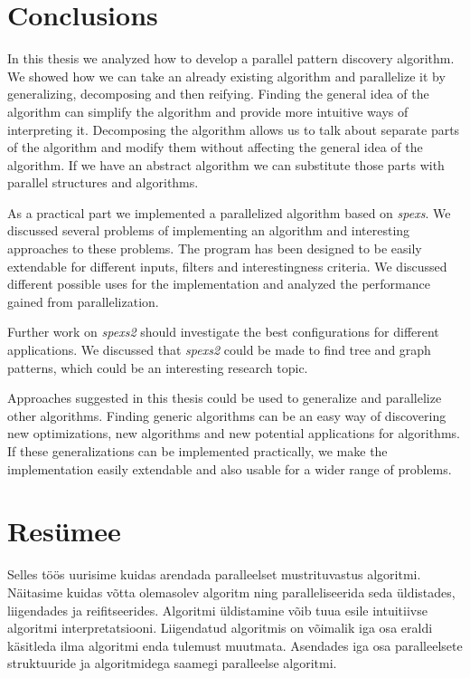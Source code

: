 \chapter{Conclusions}
\label{c:conclusions}

In this thesis we analyzed how to develop a parallel pattern discovery algorithm. We showed how we can take an already existing algorithm and parallelize it by generalizing, decomposing and then reifying. Finding the general idea of the algorithm can simplify the algorithm and provide more intuitive ways of interpreting it. Decomposing the algorithm allows us to talk about separate parts of the algorithm and modify them without affecting the general idea of the algorithm. If we have an abstract algorithm we can substitute those parts with parallel structures and algorithms.

As a practical part we implemented a parallelized algorithm based on \emph{spexs}\cite{spexs}. We discussed several problems of implementing an algorithm and interesting approaches to these problems. The program has been designed to be easily extendable for different inputs, filters and interestingness criteria. We discussed different possible uses for the implementation and analyzed the performance gained from parallelization.

Further work on \emph{spexs2} should investigate the best configurations for different applications. We discussed that \emph{spexs2} could be made to find tree and graph patterns, which could be an interesting research topic.

Approaches suggested in this thesis could be used to generalize and parallelize other algorithms. Finding generic algorithms can be an easy way of discovering new optimizations, new algorithms and new potential applications for algorithms. If these generalizations can be implemented practically, we make the implementation easily extendable and also usable for a wider range of problems.

\chapter{Resümee}
\label{c:kokkuvote}

Selles töös uurisime kuidas arendada paralleelset mustrituvastus algoritmi. Näitasime kuidas võtta olemasolev algoritm ning paralleliseerida seda üldistades, liigendades ja reifitseerides. Algoritmi üldistamine võib tuua esile intuitiivse algoritmi interpretatsiooni. Liigendatud algoritmis on võimalik iga osa eraldi käsitleda ilma algoritmi enda tulemust muutmata. Asendades iga osa paralleelsete struktuuride ja algoritmidega saamegi paralleelse algoritmi.

